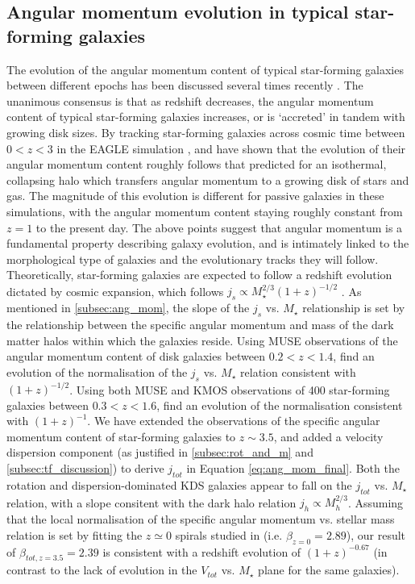 \documentclass[fleqn,usenatbib]{mnras}
\begin{document}
\subsection{Angular momentum evolution in typical star-forming galaxies}\label{subsec:angmom_discussion}
The evolution of the angular momentum content of typical star-forming galaxies between different epochs has been discussed several times recently \citep[e.g.][]{Genel2015,Teklu2015,Burkert2016a,Contini2015a,Obreschkow2016,Lagos2017,Harrison2017a,Swinbank2017}.
The unanimous consensus is that as redshift decreases, the angular momentum content of typical star-forming galaxies increases, or is `accreted' in tandem with growing disk sizes.
By tracking star-forming galaxies across cosmic time between $0 < z < 3$ in the EAGLE simulation \citep{Schaye2015}, \cite{Lagos2017} and \cite{Swinbank2017} have shown that the evolution of their angular momentum content roughly follows that predicted for an isothermal, collapsing halo which transfers angular momentum to a growing disk of stars and gas.
The magnitude of this evolution is different for passive galaxies in these simulations, with the angular momentum content staying roughly constant from $z = 1$ to the present day.
The above points suggest that angular momentum is a fundamental property describing galaxy evolution, and is intimately linked to the morphological type of galaxies and the evolutionary tracks they will follow. \\

\noindent
Theoretically, star-forming galaxies are expected to follow a redshift evolution dictated by cosmic expansion, which follows $j_{s} \propto M_{\star}^{2/3}(1 + z)^{-1/2}$ \citep[e.g.][]{Obreschkow2016}.
As mentioned in \cref{subsec:ang_mom}, the slope of the $j_{s}$ vs. $M_{\star}$ relationship is set by the relationship between the specific angular momentum and mass of the dark matter halos within which the galaxies reside.
Using MUSE observations of the angular momentum content of disk galaxies between $0.2 < z < 1.4$, \cite{Contini2015a} find an evolution of the normalisation of the $j_{s}$ vs. $M_{\star}$ relation consistent with $(1 + z)^{-1/2}$.
Using both MUSE and KMOS observations of 400 star-forming galaxies between $0.3 < z < 1.6$, \cite{Swinbank2017} find an evolution of the normalisation consistent with $(1 + z)^{-1}$.
We have extended the observations of the specific angular momentum content of star-forming galaxies to $z\sim3.5$, and added a velocity dispersion component (as justified in \cref{subsec:rot_and_m} and \cref{subsec:tf_discussion}) to derive $j_{tot}$ in Equation \ref{eq:ang_mom_final}.
Both the rotation and dispersion-dominated KDS galaxies appear to fall on the $j_{tot}$ vs. $M_{\star}$ relation, with a slope consitent with the dark halo relation $j_{h} \propto M_{h}^{2/3}$.
Assuming that the local normalisation of the specific angular momentum vs. stellar mass relation is set by fitting the $z\simeq0$ spirals studied in \cite{Romanowsky2012} (i.e. $\beta_{z=0} = 2.89$), our result of $\beta_{tot,z=3.5} = 2.39$ is consistent with a redshift evolution of $(1 + z)^{-0.67}$ (in contrast to the lack of evolution in the $V_{tot}$ vs. $M_{\star}$ plane for the same galaxies). \\ 
\end{document}
